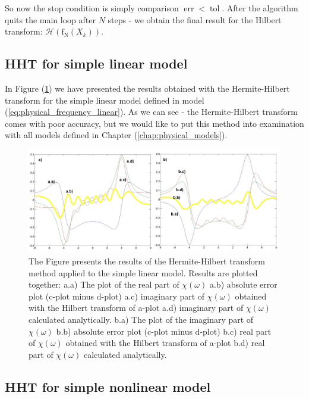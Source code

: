 \documentclass[12pt,twoside,a4paper]{article}
\numberwithin{equation}{subsection}
\numberwithin{figure}{subsection}
\begin{document}
So now the stop condition is simply comparison $\mathop{\mathrm{err}}  < \mathop{\mathrm{tol}} $. After the algorithm quits the main loop
after $N$ steps - we obtain the final result for the Hilbert transform: $\mathcal{H} (\mathrm{f_N}(X_k))$.

\subsection{HHT for simple linear model} \label{chap:hermite_lin}

In Figure (\ref{fig:hht_lin}) we have presented the results obtained with the Hermite-Hilbert transform for the simple
linear model defined in model (\ref{eq:physical_frequency_linear}). As we can see - the Hermite-Hilbert transform comes with poor accuracy,
but we would like to put this method into examination with all models defined in Chapter (\ref{chap:physical_models}).

\begin{figure} 
  \includegraphics[width=150mm]{img/hht_lin.png}
  \caption{ The Figure presents the results of the Hermite-Hilbert transform method applied to the simple linear model. Results are
  plotted together: 
   a.a) The plot of the real part of $\chi (\omega )$ 
   a.b) absolute error plot (c-plot minus d-plot) 
   a.c) imaginary part of $\chi (\omega )$ obtained with the Hilbert transform of a-plot 
   a.d) imaginary part of $\chi (\omega )$  calculated analytically. 
   b.a) The plot of the imaginary part of $\chi (\omega )$ 
   b.b) absolute error plot (c-plot minus d-plot) 
   b.c) real part of $\chi (\omega )$ obtained with the Hilbert transform of a-plot 
   b.d) real part of $\chi (\omega )$ calculated analytically. \label{fig:hht_lin}
  }
\end{figure}

\subsection{HHT for simple nonlinear model} \label{chap:hermite_nlo}
\end{document}
